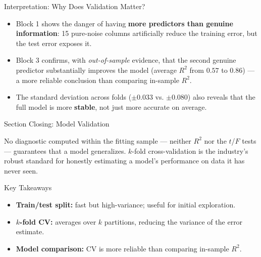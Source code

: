 \documentclass[10pt, aspectratio=169]{beamer}
\begin{document}
\begin{frame}{Interpretation: Why Does Validation Matter?}
  \footnotesize
  \begin{itemize}\itemsep=0.12cm
    \item Block 1 shows the danger of having \textbf{more predictors than genuine information}: 15 pure-noise columns artificially reduce the training error, but the test error exposes it. \pause
    \item Block 3 confirms, with \emph{out-of-sample} evidence, that the second genuine predictor substantially improves the model (average $R^2$ from $0.57$ to $0.86$) --- a more reliable conclusion than comparing in-sample $R^2$. \pause
    \item The standard deviation across folds ($\pm0.033$ vs. $\pm0.080$) also reveals that the full model is more \textbf{stable}, not just more accurate on average.
  \end{itemize}
\end{frame}

\begin{frame}{Section Closing: Model Validation}
  \begin{reflexion}
    No diagnostic computed within the fitting sample --- neither $R^2$ nor the $t$/$F$ tests --- guarantees that a model generalizes. $k$-fold cross-validation is the industry's robust standard for honestly estimating a model's performance on data it has never seen.
  \end{reflexion}

  \vspace{0.2cm}
  \pause
  \begin{block}{Key Takeaways}
    \begin{itemize}\itemsep=0.08cm
      \item \textbf{Train/test split:} fast but high-variance; useful for initial exploration.
      \item \textbf{$k$-fold CV:} averages over $k$ partitions, reducing the variance of the error estimate.
      \item \textbf{Model comparison:} CV is more reliable than comparing in-sample $R^2$.
    \end{itemize}
  \end{block}
\end{frame}
\end{document}
